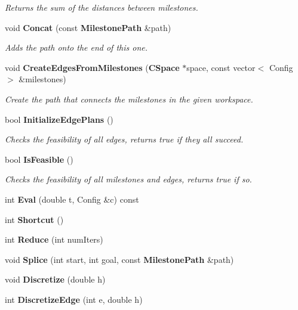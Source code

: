 \begin{DoxyCompactItemize}
\begin{DoxyCompactList}\small\item\em Returns the sum of the distances between milestones. \end{DoxyCompactList}\item 
void {\bf Concat} (const {\bf Milestone\+Path} \&path)\label{classMilestonePath_aa435533ef62a6cec973489a64e338b4c}

\begin{DoxyCompactList}\small\item\em Adds the path onto the end of this one. \end{DoxyCompactList}\item 
void {\bf Create\+Edges\+From\+Milestones} ({\bf C\+Space} $\ast$space, const vector$<$ Config $>$ \&milestones)\label{classMilestonePath_a81b465171be6e10c9c97031e92915593}

\begin{DoxyCompactList}\small\item\em Create the path that connects the milestones in the given workspace. \end{DoxyCompactList}\item 
bool {\bf Initialize\+Edge\+Plans} ()\label{classMilestonePath_a1f3189d474fa330a99a7f3d4a616c04d}

\begin{DoxyCompactList}\small\item\em Checks the feasibility of all edges, returns true if they all succeed. \end{DoxyCompactList}\item 
bool {\bf Is\+Feasible} ()\label{classMilestonePath_a5c05a9bcc0ded11cbefc52f6da31cd05}

\begin{DoxyCompactList}\small\item\em Checks the feasibility of all milestones and edges, returns true if so. \end{DoxyCompactList}\item 
int {\bf Eval} (double t, Config \&c) const 
\item 
int {\bf Shortcut} ()
\item 
int {\bf Reduce} (int num\+Iters)
\item 
void {\bf Splice} (int start, int goal, const {\bf Milestone\+Path} \&path)
\item 
void {\bf Discretize} (double h)
\item 
int {\bf Discretize\+Edge} (int e, double h)\label{classMilestonePath_aaa257fd37945a9d2d51c82453137ae6e}


\end{DoxyCompactItemize}
